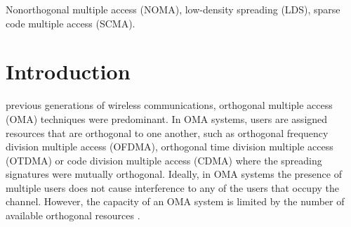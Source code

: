 \documentclass[journal,comsoc]{IEEEtran}
\begin{document}
\begin{IEEEkeywords}
Nonorthogonal multiple access (NOMA), low-density spreading (LDS), sparse code multiple access (SCMA).
\end{IEEEkeywords}



%
\IEEEpeerreviewmaketitle


\section{Introduction}
% 
% 
% 
% 

 previous generations of wireless communications, orthogonal multiple access (OMA) techniques were predominant. In OMA systems, users are assigned resources that are orthogonal to one another, such as orthogonal frequency division multiple access (OFDMA), orthogonal time division multiple access (OTDMA) or code division multiple access (CDMA) where the spreading signatures were mutually orthogonal. Ideally, in OMA systems the presence of multiple users does not cause interference to any of the users that occupy the channel. However, the capacity of an OMA system is limited by the number of available orthogonal resources \cite{Dai2018}.
\end{document}
